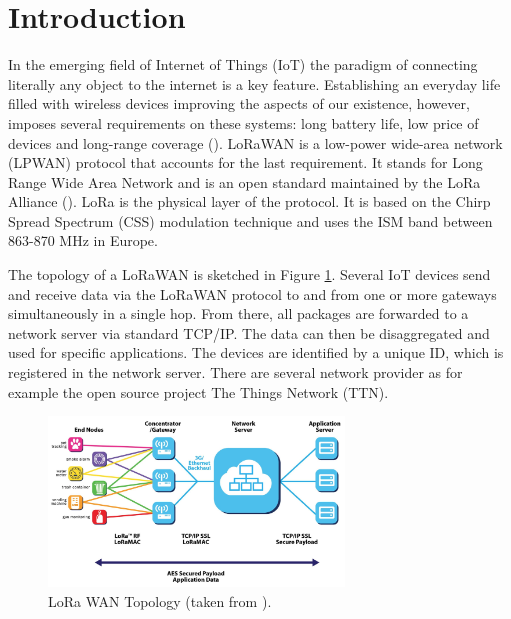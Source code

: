 

\pgfplotsset{compat=1.11}



\section{Introduction}\label{sec:intro}

In the emerging field of Internet of Things (IoT) the paradigm of connecting literally any object to the internet is a key feature. Establishing an everyday life filled with wireless devices improving the aspects of our existence, however, imposes several requirements on these systems: long battery life, low price of devices and long-range coverage (\cite{Nolan2016, Augustin2016}).  LoRaWAN is a low-power wide-area network (LPWAN) protocol that accounts for the last requirement. It stands for Long Range Wide Area Network and is an open standard maintained by the LoRa Alliance (\cite{LoRaAlliance2015}). LoRa is the physical layer of the protocol. It is based on the Chirp Spread Spectrum (CSS) modulation technique and uses the ISM band between 863-870 MHz in Europe. 

The topology of a LoRaWAN  is sketched in Figure \ref{fig:loraarch}. Several IoT devices send and receive data via the LoRaWAN protocol to and from one or more gateways simultaneously in a single hop. From there, all packages are forwarded to a network server via standard TCP/IP. The data can then be disaggregated and used for specific applications. The devices are identified by a unique ID, which is registered in the network server. There are several network provider as for example the open source project The Things Network (TTN).

\begin{figure}[h!]
\centering
\includegraphics[width=0.7\textwidth]{figures/LoRa_Arch}
\caption{LoRa WAN Topology (taken from \cite{LoRaAlliance2015}).}\label{fig:loraarch}
\end{figure}

